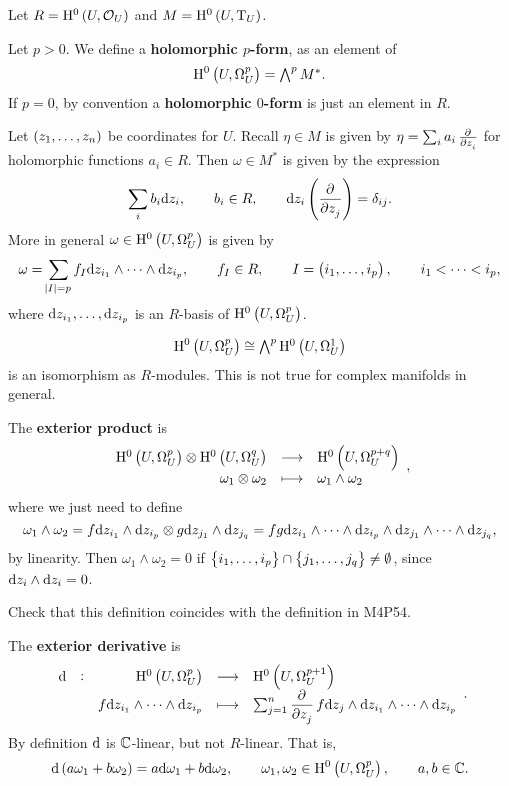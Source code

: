 Let $ R = \H^0\br{U, \OOO_U} $ and $ M = \H^0\br{U, \T_U} $.

\begin{definition}
Let $ p > 0 $. We define a \textbf{holomorphic $ p $-form}, as an element of
$$ \H^0\br{U, \Omega_U^p} = \ext^pM^*. $$
If $ p = 0 $, by convention a \textbf{holomorphic $ 0 $-form} is just an element in $ R $.
\end{definition}

Let $ \br{z_1, \dots, z_n} $ be coordinates for $ U $. Recall $ \eta \in M $ is given by $ \eta = \sum_i a_i\tpd{}{z_i} $ for holomorphic functions $ a_i \in R $. Then $ \omega \in M^* $ is given by the expression
$$ \sum_i b_i\d z_i, \qquad b_i \in R, \qquad \d z_i\br{\dpd{}{z_j}} = \delta_{ij}. $$
More in general $ \omega \in \H^0\br{U, \Omega_U^p} $ is given by
$$ \omega = \sum_{\abs{I} = p} f_I\d z_{i_1} \wedge \dots \wedge \d z_{i_p}, \qquad f_I \in R, \qquad I = \br{i_1, \dots, i_p}, \qquad i_1 < \dots < i_p, $$
where $ \mathrm{d} z_{i_1}, \dots, \mathrm{d} z_{i_p} $ is an $ R $-basis of $ \H^0\br{U, \Omega_U^p} $.

\begin{example*}
$$ \H^0\br{U, \Omega_U^p} \cong \ext^p\H^0\br{U, \Omega_U^1} $$
is an isomorphism as $ R $-modules. This is not true for complex manifolds in general.
\end{example*}

The \textbf{exterior product} is
$$ \function{\H^0\br{U, \Omega_U^p} \otimes \H^0\br{U, \Omega_U^q}}{\H^0\br{U, \Omega_U^{p + q}}}{\omega_1 \otimes \omega_2}{\omega_1 \wedge \omega_2}, $$
where we just need to define
$$ \omega_1 \wedge \omega_2 = f\mathrm{d} z_{i_1} \wedge \mathrm{d} z_{i_p} \otimes g\mathrm{d} z_{j_1} \wedge \mathrm{d} z_{j_q} = fg\mathrm{d} z_{i_1} \wedge \dots \wedge \mathrm{d} z_{i_p} \wedge \mathrm{d} z_{j_1} \wedge \dots \wedge \mathrm{d} z_{j_q}, $$
by linearity. Then $ \omega_1 \wedge \omega_2 = 0 $ if $ \cbr{i_1, \dots, i_p} \cap \cbr{j_1, \dots, j_q} \ne \emptyset $, since $ \mathrm{d} z_i \wedge \mathrm{d} z_i = 0 $.

\begin{exercise*}
Check that this definition coincides with the definition in M4P54.
\end{exercise*}

The \textbf{exterior derivative} is
$$ \function[\d]{\H^0\br{U, \Omega_U^p}}{\H^0\br{U, \Omega_U^{p + 1}}}{f\d z_{i_1} \wedge \dots \wedge \d z_{i_p}}{\sum_{j = 1}^n \dpd{}{z_j}f\d z_j \wedge \d z_{i_1} \wedge \dots \wedge \d z_{i_p}}. $$
By definition $ \mathrm{d} $ is $ \mathbb{C} $-linear, but not $ R $-linear. That is,
$$ \d\br{a\omega_1 + b\omega_2} = a\d\omega_1 + b\d\omega_2, \qquad \omega_1, \omega_2 \in \H^0\br{U, \Omega_U^p}, \qquad a, b \in \CC. $$


